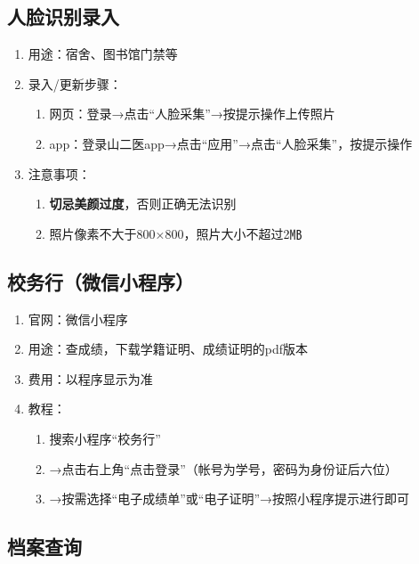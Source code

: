 \subsection[人脸识别录入]{人脸识别录入}
\label{face_system}
\begin{enumerate}
    \item 用途：宿舍、图书馆门禁等
    \item 录入/更新步骤：
    \begin{enumerate}
        \item 网页：登录→点击“人脸采集”→按提示操作上传照片
        \item app：登录山二医app→点击“应用”→点击“人脸采集”，按提示操作
    \end{enumerate}
    \item 注意事项：
    \begin{enumerate}
        \item \textbf{切忌美颜过度}，否则正确无法识别
        \item 照片像素不大于800×800，照片大小不超过2㎆
    \end{enumerate}
\end{enumerate}

\subsection[校务行（微信小程序）]{校务行（微信小程序）}
\label{cert_prover}
\begin{enumerate}
    \item 官网：微信小程序
    \item 用途：查成绩，下载学籍证明、成绩证明的pdf版本
    \item 费用：以程序显示为准
    \item 教程：
          \begin{enumerate}
              \item 搜索小程序“校务行”
              \item →点击右上角“点击登录”（帐号为学号，密码为身份证后六位）\footnotemark
              \item →按需选择“电子成绩单”或“电子证明”→按照小程序提示进行即可
          \end{enumerate}
\end{enumerate}

\subsection[档案查询]{档案查询}
